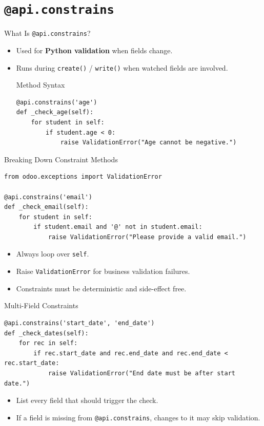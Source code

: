 \section{\texttt{@api.constrains}}

\begin{frame}[fragile]{What Is \texttt{@api.constrains}?}
	\begin{itemize}
		\item Used for \textbf{Python validation} when fields change.
		\item Runs during \texttt{create()} / \texttt{write()} when watched fields are involved.
\begin{block}{Method Syntax}
\begin{lstlisting}
@api.constrains('age')
def _check_age(self):
	for student in self:
		if student.age < 0:
			raise ValidationError("Age cannot be negative.")
\end{lstlisting}
\end{block}
	\end{itemize}
\end{frame}

\begin{frame}[fragile]{Breaking Down Constraint Methods}
\begin{lstlisting}
from odoo.exceptions import ValidationError

@api.constrains('email')
def _check_email(self):
	for student in self:
		if student.email and '@' not in student.email:
			raise ValidationError("Please provide a valid email.")
\end{lstlisting}
	\begin{itemize}
		\item Always loop over \texttt{self}.
		\item Raise \texttt{ValidationError} for business validation failures.
		\item Constraints must be deterministic and side-effect free.
	\end{itemize}
\end{frame}

\begin{frame}[fragile]{Multi-Field Constraints}
\begin{lstlisting}
@api.constrains('start_date', 'end_date')
def _check_dates(self):
	for rec in self:
		if rec.start_date and rec.end_date and rec.end_date < rec.start_date:
			raise ValidationError("End date must be after start date.")
\end{lstlisting}
	\begin{itemize}
		\item List every field that should trigger the check.
		\item If a field is missing from \texttt{@api.constrains}, changes to it may skip validation.
	\end{itemize}
\end{frame}


